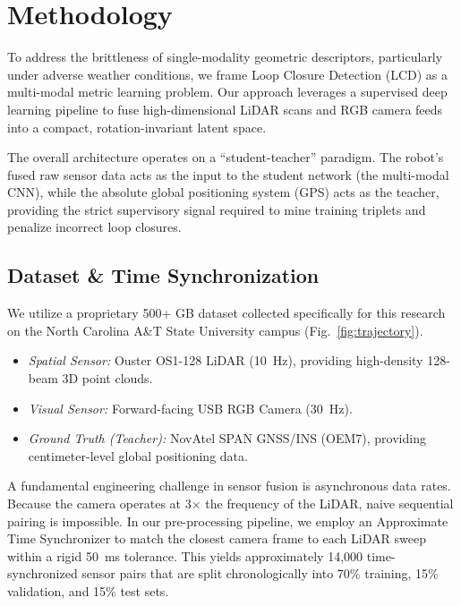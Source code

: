 
\section{Methodology}
\label{sec:methodology}

To address the brittleness of single-modality geometric descriptors, particularly under adverse weather conditions, we frame Loop Closure Detection (LCD) as a multi-modal metric learning problem. Our approach leverages a supervised deep learning pipeline to fuse high-dimensional LiDAR scans and RGB camera feeds into a compact, rotation-invariant latent space.

The overall architecture operates on a ``student-teacher'' paradigm. The robot's fused raw sensor data acts as the input to the student network (the multi-modal CNN), while the absolute global positioning system (GPS) acts as the teacher, providing the strict supervisory signal required to mine training triplets and penalize incorrect loop closures.

\subsection{Dataset \& Time Synchronization}
We utilize a proprietary 500+ GB dataset collected specifically for this research on the North Carolina A\&T State University campus (Fig.~\ref{fig:trajectory}).
\begin{itemize}
    \item \emph{Spatial Sensor:} Ouster OS1-128 LiDAR (10~Hz), providing high-density 128-beam 3D point clouds.
    \item \emph{Visual Sensor:} Forward-facing USB RGB Camera (30~Hz).
    \item \emph{Ground Truth (Teacher):} NovAtel SPAN GNSS/INS (OEM7), providing centimeter-level global positioning data.
\end{itemize}

A fundamental engineering challenge in sensor fusion is asynchronous data rates. Because the camera operates at 3$\times$ the frequency of the LiDAR, naive sequential pairing is impossible. In our pre-processing pipeline, we employ an Approximate Time Synchronizer to match the closest camera frame to each LiDAR sweep within a rigid 50~ms tolerance. This yields approximately 14,000 time-synchronized sensor pairs that are split chronologically into 70\% training, 15\% validation, and 15\% test sets.

